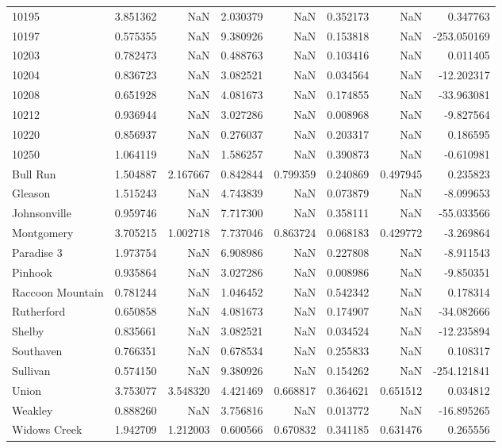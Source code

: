 \begin{tabular}{lrrrrrrr}
10195 & 3.851362 & NaN & 2.030379 & NaN & 0.352173 & NaN & 0.347763 \\
10197 & 0.575355 & NaN & 9.380926 & NaN & 0.153818 & NaN & -253.050169 \\
10203 & 0.782473 & NaN & 0.488763 & NaN & 0.103416 & NaN & 0.011405 \\
10204 & 0.836723 & NaN & 3.082521 & NaN & 0.034564 & NaN & -12.202317 \\
10208 & 0.651928 & NaN & 4.081673 & NaN & 0.174855 & NaN & -33.963081 \\
10212 & 0.936944 & NaN & 3.027286 & NaN & 0.008968 & NaN & -9.827564 \\
10220 & 0.856937 & NaN & 0.276037 & NaN & 0.203317 & NaN & 0.186595 \\
10250 & 1.064119 & NaN & 1.586257 & NaN & 0.390873 & NaN & -0.610981 \\
Bull Run & 1.504887 & 2.167667 & 0.842844 & 0.799359 & 0.240869 & 0.497945 & 0.235823 \\
Gleason & 1.515243 & NaN & 4.743839 & NaN & 0.073879 & NaN & -8.099653 \\
Johnsonville & 0.959746 & NaN & 7.717300 & NaN & 0.358111 & NaN & -55.033566 \\
Montgomery & 3.705215 & 1.002718 & 7.737046 & 0.863724 & 0.068183 & 0.429772 & -3.269864 \\
Paradise 3 & 1.973754 & NaN & 6.908986 & NaN & 0.227808 & NaN & -8.911543 \\
Pinhook & 0.935864 & NaN & 3.027286 & NaN & 0.008986 & NaN & -9.850351 \\
Raccoon Mountain & 0.781244 & NaN & 1.046452 & NaN & 0.542342 & NaN & 0.178314 \\
Rutherford & 0.650858 & NaN & 4.081673 & NaN & 0.174907 & NaN & -34.082666 \\
Shelby & 0.835661 & NaN & 3.082521 & NaN & 0.034524 & NaN & -12.235894 \\
Southaven & 0.766351 & NaN & 0.678534 & NaN & 0.255833 & NaN & 0.108317 \\
Sullivan & 0.574150 & NaN & 9.380926 & NaN & 0.154262 & NaN & -254.121841 \\
Union & 3.753077 & 3.548320 & 4.421469 & 0.668817 & 0.364621 & 0.651512 & 0.034812 \\
Weakley & 0.888260 & NaN & 3.756816 & NaN & 0.013772 & NaN & -16.895265 \\
Widows Creek & 1.942709 & 1.212003 & 0.600566 & 0.670832 & 0.341185 & 0.631476 & 0.265556 \\
\bottomrule
\end{tabular}
